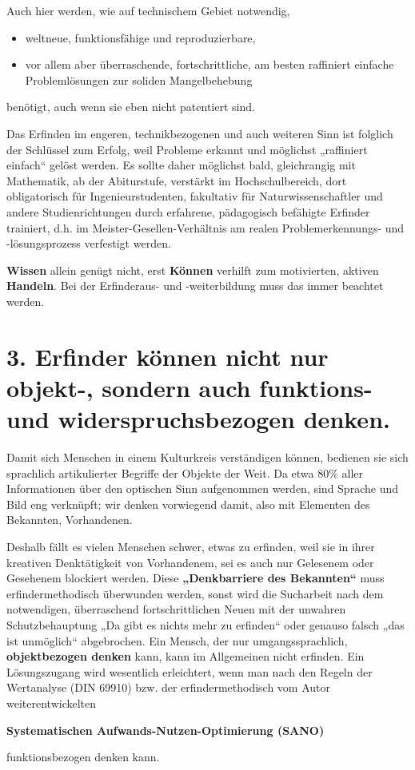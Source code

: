 \documentclass[11pt,a4paper]{article}
\begin{document}
Auch hier werden, wie auf technischem Gebiet notwendig,
\begin{itemize}[noitemsep]
\item weltneue, funktionsfähige und reproduzierbare,
\item vor allem aber überraschende, fortschrittliche, am besten raffiniert
  einfache Problem\-lö\-sun\-gen zur soliden Mangelbehebung
\end{itemize}
benötigt, auch wenn sie eben nicht patentiert sind.

Das Erfinden im engeren, technikbezogenen und auch weiteren Sinn ist folglich
der Schlüssel zum Erfolg, weil Probleme erkannt und möglichst „raffiniert
einfach“ gelöst werden. Es sollte daher möglichst bald, gleichrangig mit
Mathematik, ab der Abiturstufe, verstärkt im Hochschulbereich, dort
obligatorisch für Ingenieurstudenten, fakultativ für Naturwissenschaftler und
andere Studienrichtungen durch erfahrene, pädagogisch befähigte Erfinder
trainiert, d.h. im Meister-Gesellen-Verhältnis am realen Problemerkennungs-
und -lösungsprozess verfestigt werden.

\textbf{Wissen} allein genügt nicht, erst \textbf{Können} verhilft zum
motivierten, aktiven \textbf{Handeln}. Bei der Erfinderaus- und -weiterbildung
muss das immer beachtet werden.

\section*{3. Erfinder können nicht nur objekt-, sondern auch funktions- und 
widerspruchsbezogen denken.}

Damit sich Menschen in einem Kulturkreis verständigen können, bedienen sie
sich sprachlich artikulierter Begriffe der Objekte der Weit.  Da etwa 80\%
aller Informationen über den optischen Sinn aufgenommen werden, sind Sprache
und Bild eng verknüpft; wir denken vorwiegend damit, also mit Elementen des
Bekannten, Vorhandenen.

Deshalb fällt es vielen Menschen schwer, etwas zu erfinden, weil sie in ihrer
kreativen Denk\-tä\-tig\-keit von Vorhandenem, sei es auch nur Gelesenem oder
Gesehenem blockiert werden.  Diese \textbf{„Denkbarriere des Bekannten“} muss
erfindermethodisch überwunden werden, sonst wird die Sucharbeit nach dem
notwendigen, überraschend fortschrittlichen Neuen mit der unwahren
Schutzbehauptung „Da gibt es nichts mehr zu erfinden“ oder genauso falsch „das
ist unmöglich“ abgebrochen.  Ein Mensch, der nur umgangssprachlich,
\textbf{objektbezogen denken} kann, kann im Allgemeinen nicht erfinden.  Ein
Lösungszugang wird wesentlich erleichtert, wenn man nach den Regeln der
Wertanalyse (DIN 69910) bzw. der erfindermethodisch vom Autor
weiterentwickelten
\begin{center}\bf  
  Systematischen Aufwands-Nutzen-Optimierung (SANO) 
\end{center}
funktionsbezogen denken kann.
\end{document}
